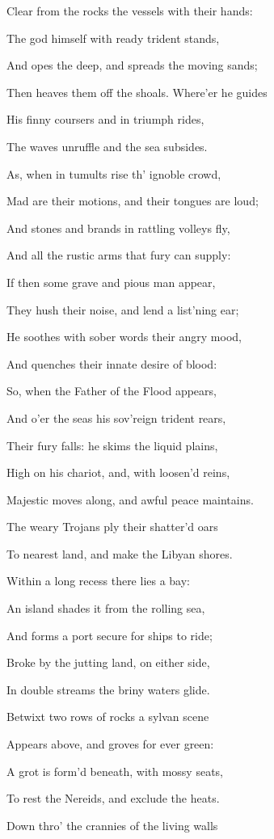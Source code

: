 Clear from the rocks the vessels with their hands:

The god himself with ready trident stands,

And opes the deep, and spreads the moving sands;

Then heaves them off the shoals. Where’er he guides

His finny coursers and in triumph rides,

The waves unruffle and the sea subsides.

As, when in tumults rise th’ ignoble crowd,

Mad are their motions, and their tongues are loud;

And stones and brands in rattling volleys fly,

And all the rustic arms that fury can supply:

If then some grave and pious man appear,

They hush their noise, and lend a list’ning ear;

He soothes with sober words their angry mood,

And quenches their innate desire of blood:

So, when the Father of the Flood appears,

And o’er the seas his sov’reign trident rears,

Their fury falls: he skims the liquid plains,

High on his chariot, and, with loosen’d reins,

Majestic moves along, and awful peace maintains.

The weary Trojans ply their shatter’d oars

To nearest land, and make the Libyan shores.

Within a long recess there lies a bay:

An island shades it from the rolling sea,

And forms a port secure for ships to ride;

Broke by the jutting land, on either side,

In double streams the briny waters glide.

Betwixt two rows of rocks a sylvan scene

Appears above, and groves for ever green:

A grot is form’d beneath, with mossy seats,

To rest the Nereids, and exclude the heats.

Down thro’ the crannies of the living walls

